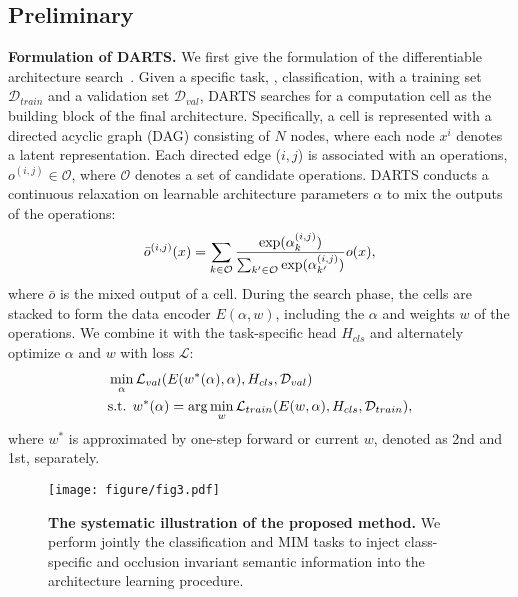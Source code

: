 \documentclass[10pt,twocolumn,letterpaper]{article}
\newcommand{\mypara}[1]{\vspace{1mm}\noindent\textbf{#1}}
\begin{document}
   \subsection{Preliminary}
\vspace{-4pt}
\label{sec:prel}
\mypara{Formulation of DARTS.}
We first give the formulation of the differentiable architecture search~\cite{liu2018darts}. Given a specific task, \eg, classification,
with a training set $\mathcal{D}_{train}$ 
and a validation set $\mathcal{D}_{val}$, DARTS searches for a computation cell as the building block of the final architecture.
Specifically, a cell is represented with a directed acyclic graph (DAG) consisting of $N$ nodes, where each node $x^{i}$ denotes a latent representation. 
Each directed edge ($i, j$) is associated with an operations, $o^{(i, j)} \in \mathcal{O}$, where $\mathcal{O}$ denotes a set of candidate operations.
DARTS conducts a continuous relaxation on learnable architecture parameters $\alpha$ to mix the outputs of the operations:
\vspace{-4pt}
\begin{equation}
\bar{o}^{(i, j)}(x) = \sum_{k\in\mathcal{O}}\frac{\exp(\alpha_{k}^{(i, j)})}{\sum_{k'\in\mathcal{O}}\exp(\alpha_{k'}^{(i, j)})}o(x),
  \label{eq:original_darts}
  \vspace{-4pt}
\end{equation}
where $\bar{o}$ is the mixed output of a cell.
During the search phase, the cells are stacked to form the data encoder $E(\alpha, w)$, including the $\alpha$ and weights $w$ of the operations. 
We combine it with the task-specific head $H_{cls}$ and alternately optimize $\alpha$ and $w$ with loss $\mathcal{L}$:
\vspace{-4pt}
\begin{equation}
  \begin{split}
  & \min_{\alpha} \mathcal{L}_{val}(E(w^{\ast}(\alpha), \alpha), H_{cls}, \mathcal{D}_{val}) \\
  & \text{s.t. } w^{\ast}(\alpha) = \arg\min_{w}\mathcal{L}_{train}(E(w,\alpha), H_{cls}, \mathcal{D}_{train}),
  \end{split}
  \vspace{-4pt}
  \label{eq:alternate}
\end{equation}
where $w^{\ast}$ is approximated by one-step forward or current $w$, denoted as 2nd and 1st, separately.
\begin{figure}[t]
    \centering
     \texttt{[image: figure/fig3.pdf]}
     \vspace{-6pt}
     \caption{\textbf{The systematic illustration of the proposed method.} We perform jointly the classification and MIM tasks to inject class-specific and occlusion invariant semantic information into the architecture learning procedure. }
     \label{fig:fig3}
     \vspace{-8pt}
  \end{figure}
\end{document}
